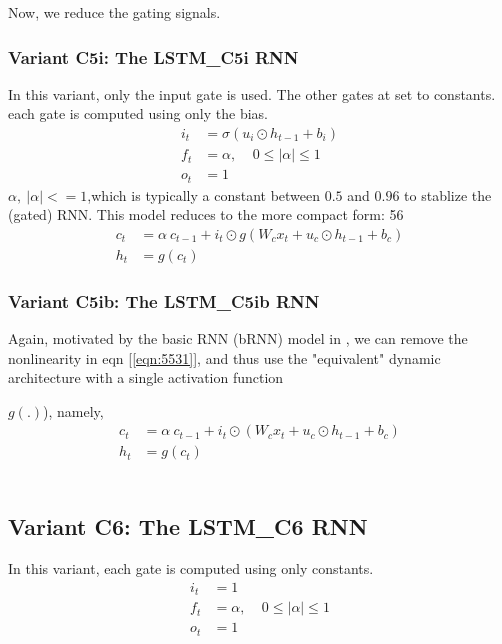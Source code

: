 \documentclass{article}
\begin{document}
{{{{Now, we reduce the gating signals.

\subsubsection{Variant C5i: The LSTM\_C5i RNN}

In this variant, only the input gate is used. The other gates at set to constants. each gate is computed using only the bias.
\begin{align}
	i_t &= \sigma(u_i \odot  h_{t-1} + b_i)\\
	f_t &= \alpha , ~~~~~  0 \leq |\alpha| \leq  1 \\
	o_t &= 1
\end{align}
$\alpha, ~ |\alpha | <= 1$,which is typically a constant between $0.5$ and $0.96$ to stablize the (gated) RNN.
This model reduces to the more compact form: 56
\begin{align}
	\label{eqn:5iC31}	 c_t &=  \alpha ~ c_{t-1} + i_t \odot g(W_c x_t + u_c \odot  h_{t-1} + b_c)\\
	\label{eqn:5iC41}	h_t &=  g(c_t)
\end{align}

\subsubsection{Variant C5ib: The LSTM\_C5ib RNN}

Again, motivated by the basic RNN (bRNN) model in \cite {salem2016basic}, we can remove the nonlinearity in eqn [\ref{eqn:5531}], and thus use the "equivalent" dynamic architecture with a single activation function {$g(.)$), namely,
\begin{align}
	\label{eqn:5ibC531}	c_t &=  \alpha ~ c_{t-1} + i_t \odot (W_c x_t + u_c \odot  h_{t-1} + b_c)\\
	\label{eqn:5ibC541}	h_t &=  g(c_t)
\end{align}
\\

\subsection{Variant C6: The LSTM\_C6 RNN}
In this variant, each gate is computed using only constants.
\begin{align}
	i_t &= 1 \\
	f_t &= \alpha , ~~~~~  0 \leq |\alpha| \leq  1 \\
	o_t &= 1
\end{align}

}}}}}
\end{document}
